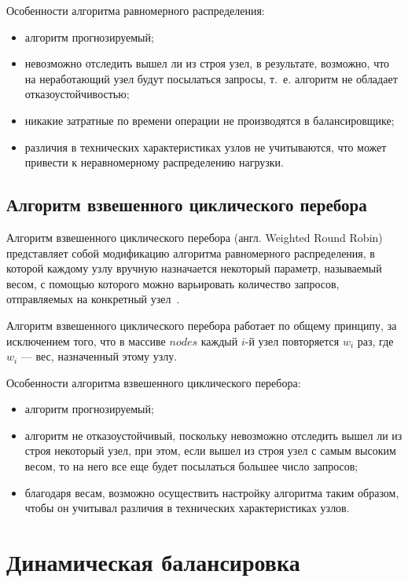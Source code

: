 Особенности алгоритма равномерного распределения:
\begin{itemize}
	\item алгоритм прогнозируемый;
	\item невозможно отследить вышел ли из строя узел, в результате, возможно, что на неработающий узел будут посылаться запросы, т.~е. алгоритм не обладает отказоустойчивостью;
	\item никакие затратные по времени операции не производятся в балансировщике;
	\item различия в технических характеристиках узлов не учитываются, что может привести к неравномерному распределению нагрузки.
\end{itemize}


\subsection*{Алгоритм взвешенного циклического перебора}

Алгоритм взвешенного циклического перебора (англ. Weighted Round Robin) представляет собой модификацию алгоритма равномерного распределения, в которой каждому узлу вручную назначается некоторый параметр, называемый весом, с помощью которого можно варьировать количество запросов, отправляемых на конкретный узел~\cite{part_algos}.

Алгоритм взвешенного циклического перебора работает по общему принципу, за исключением того, что в массиве $nodes$ каждый $i$-й узел повторяется $w_i$ раз, где $w_i$ --- вес, назначенный этому узлу.

Особенности алгоритма взвешенного циклического перебора:
\begin{itemize}
	\item алгоритм прогнозируемый;
	\item алгоритм не отказоустойчивый, поскольку невозможно отследить вышел ли из строя некоторый узел, при этом, если вышел из строя узел с самым высоким весом, то на него все еще будет посылаться большее число запросов;
	\item благодаря весам, возможно осуществить настройку алгоритма таким образом, чтобы он учитывал различия в технических характеристиках узлов.
\end{itemize}


\section{Динамическая балансировка}

